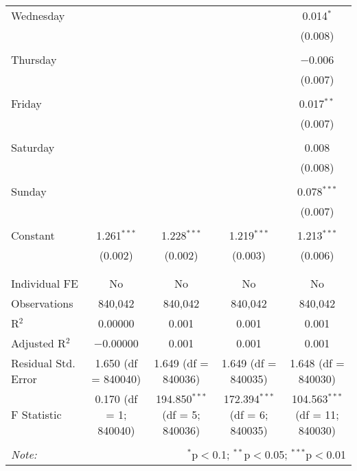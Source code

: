 \documentclass[
]{article}
\begin{document}
\begin{table}[!htbp]
{\begin{tabular}{@{\extracolsep{5pt}}lcccc}
 Wednesday &  &  &  & 0.014$^{*}$ \\ 
  &  &  &  & (0.008) \\ 
  & & & & \\ 
 Thursday &  &  &  & $-$0.006 \\ 
  &  &  &  & (0.007) \\ 
  & & & & \\ 
 Friday &  &  &  & 0.017$^{**}$ \\ 
  &  &  &  & (0.007) \\ 
  & & & & \\ 
 Saturday &  &  &  & 0.008 \\ 
  &  &  &  & (0.008) \\ 
  & & & & \\ 
 Sunday &  &  &  & 0.078$^{***}$ \\ 
  &  &  &  & (0.007) \\ 
  & & & & \\ 
 Constant & 1.261$^{***}$ & 1.228$^{***}$ & 1.219$^{***}$ & 1.213$^{***}$ \\ 
  & (0.002) & (0.002) & (0.003) & (0.006) \\ 
  & & & & \\ 
\hline \\[-1.8ex] 
Individual FE & No & No & No & No \\ 
Observations & 840,042 & 840,042 & 840,042 & 840,042 \\ 
R$^{2}$ & 0.00000 & 0.001 & 0.001 & 0.001 \\ 
Adjusted R$^{2}$ & $-$0.00000 & 0.001 & 0.001 & 0.001 \\ 
Residual Std. Error & 1.650 (df = 840040) & 1.649 (df = 840036) & 1.649 (df = 840035) & 1.648 (df = 840030) \\ 
F Statistic & 0.170 (df = 1; 840040) & 194.850$^{***}$ (df = 5; 840036) & 172.394$^{***}$ (df = 6; 840035) & 104.563$^{***}$ (df = 11; 840030) \\ 
\hline 
\hline \\[-1.8ex] 
\textit{Note:}  & \multicolumn{4}{r}{$^{*}$p$<$0.1; $^{**}$p$<$0.05; $^{***}$p$<$0.01} \\ 
\end{tabular}
} 
\end{table} 
\newpage
\end{document}
